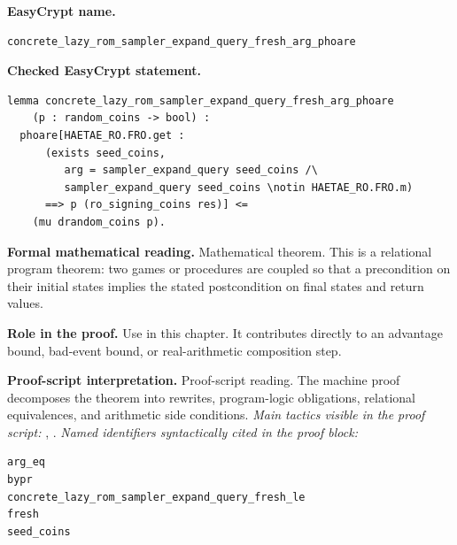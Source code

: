 \begin{formaltheorem}
\noindent\textbf{EasyCrypt name.}
\begin{lstlisting}[language=EasyCrypt,basicstyle=\ttfamily\scriptsize]
concrete_lazy_rom_sampler_expand_query_fresh_arg_phoare
\end{lstlisting}
\noindent\textbf{Checked EasyCrypt statement.}
\begin{lstlisting}[language=EasyCrypt,basicstyle=\ttfamily\scriptsize]
lemma concrete_lazy_rom_sampler_expand_query_fresh_arg_phoare
    (p : random_coins -> bool) :
  phoare[HAETAE_RO.FRO.get :
      (exists seed_coins,
         arg = sampler_expand_query seed_coins /\
         sampler_expand_query seed_coins \notin HAETAE_RO.FRO.m)
      ==> p (ro_signing_coins res)] <=
    (mu drandom_coins p).
\end{lstlisting}
\noindent\textbf{Formal mathematical reading.}
Mathematical theorem. This is a relational program theorem: two games or procedures are coupled so that a precondition on their initial states implies the stated postcondition on final states and return values.

\noindent\textbf{Role in the proof.}
Use in this chapter. It contributes directly to an advantage bound, bad-event bound, or real-arithmetic composition step.

\noindent\textbf{Proof-script interpretation.}
Proof-script reading. The machine proof decomposes the theorem into rewrites, program-logic obligations, relational equivalences, and arithmetic side conditions.
\emph{Main tactics visible in the proof script:} \ec{rewrite}, \ec{apply}.
\emph{Named identifiers syntactically cited in the proof block:}
\begin{lstlisting}[language=EasyCrypt,basicstyle=\ttfamily\scriptsize]
arg_eq
bypr
concrete_lazy_rom_sampler_expand_query_fresh_le
fresh
seed_coins
\end{lstlisting}

\end{formaltheorem}

